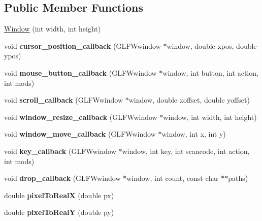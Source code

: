 \subsection*{Public Member Functions}
\begin{DoxyCompactItemize}
\item 
\hyperlink{classWindow_a486004a00e3c0b27dcf2834a10c4f365}{Window} (int width, int height)
\item 
\hypertarget{classWindow_a2e3c05738585d2cf2f31296cb62aee65}{}void {\bfseries cursor\+\_\+position\+\_\+callback} (G\+L\+F\+Wwindow $\ast$window, double xpos, double ypos)\label{classWindow_a2e3c05738585d2cf2f31296cb62aee65}

\item 
\hypertarget{classWindow_ad8c5512dd0fa97c97dc0439b86db10c4}{}void {\bfseries mouse\+\_\+button\+\_\+callback} (G\+L\+F\+Wwindow $\ast$window, int button, int action, int mods)\label{classWindow_ad8c5512dd0fa97c97dc0439b86db10c4}

\item 
\hypertarget{classWindow_a019c0a350d97b8088ac1cd03de610738}{}void {\bfseries scroll\+\_\+callback} (G\+L\+F\+Wwindow $\ast$window, double xoffset, double yoffset)\label{classWindow_a019c0a350d97b8088ac1cd03de610738}

\item 
\hypertarget{classWindow_a8844f728ca893a593de1ead282cf90bb}{}void {\bfseries window\+\_\+resize\+\_\+callback} (G\+L\+F\+Wwindow $\ast$window, int width, int height)\label{classWindow_a8844f728ca893a593de1ead282cf90bb}

\item 
\hypertarget{classWindow_a2bbacf729c09798d13b71e1fb06750be}{}void {\bfseries window\+\_\+move\+\_\+callback} (G\+L\+F\+Wwindow $\ast$window, int x, int y)\label{classWindow_a2bbacf729c09798d13b71e1fb06750be}

\item 
\hypertarget{classWindow_a183e54620c91966a3ff4d96a036a9b03}{}void {\bfseries key\+\_\+callback} (G\+L\+F\+Wwindow $\ast$window, int key, int scancode, int action, int mods)\label{classWindow_a183e54620c91966a3ff4d96a036a9b03}

\item 
\hypertarget{classWindow_a5dc69750a9bec10b2ae89896c5257a49}{}void {\bfseries drop\+\_\+callback} (G\+L\+F\+Wwindow $\ast$window, int count, const char $\ast$$\ast$paths)\label{classWindow_a5dc69750a9bec10b2ae89896c5257a49}

\item 
\hypertarget{classWindow_a176bd800aba0a1a165de1558ace03ac4}{}double {\bfseries pixel\+To\+Real\+X} (double px)\label{classWindow_a176bd800aba0a1a165de1558ace03ac4}

\item 
\hypertarget{classWindow_a7eb2f7ae97fcb16c98b6d8f42a52982a}{}double {\bfseries pixel\+To\+Real\+Y} (double py)\label{classWindow_a7eb2f7ae97fcb16c98b6d8f42a52982a}

\end{DoxyCompactItemize}
